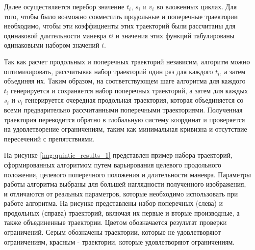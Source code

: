 Далее осуществляется перебор значение $t_i$, $s_i$ и $v_i$ во вложенных циклах. Для того, чтобы было возможно
совместить продольные и поперечные траектории необходимо, чтобы эти коэффициенты этих траекторий были рассчитаны для
одинаковой длительности маневра $ti$ и значения этих функций табулированы одинаковыми набором значений $t$.

Так как расчет продольных и поперечных траекторий независим, алгоритм можно оптимизировать, рассчитывая набор траекторий
один раз для каждого $t_i$, а затем объединяя их. Таким образом, на соответствующем шаге алгоритма для каждого $t_i$
генерируется и сохраняется набор поперечных траекторий, а затем для каждых $s_i$ и $v_i$ генерируется очередная
продольная траектория, которая объединяется со всеми предварительно рассчитанными поперечными траекториями.
Полученная траектория переводится обратно в глобальную систему координат и проверяется на удовлетворение ограничениям,
таким как минимальная кривизна и отсутствие пересечений с препятствиями.



На рисунке \ref{img:quintic_results_1} представлен пример набора траекторий, сформированных алгоритмом путем варьирования
целевого продольного положения, целевого поперечного положения и длительности маневра. Параметры работы алгоритма выбраны
для большей наглядности полученного изображения, и отличаются от реальных параметров, которые необходимо использовать
при работе алгоритма. На рисунке представлены набор поперечных (слева) и продольных (справа) траекторий, включая их
первые и вторые производные, а также объединенные траектории. Цветом обозначается результат проверки ограничений.
Серым обозначены траектории, которые не удовлетворяют ограничениям, красным - траектории, которые удовлетворяют
ограничениям.

